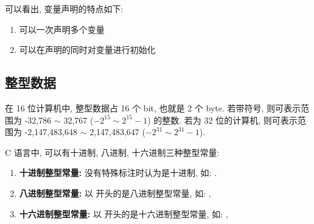        可以看出, 变量声明的特点如下:
            \begin{enumerate}
                \item 可以一次声明多个变量
                \item 可以在声明的同时对变量进行初始化
            \end{enumerate}


    \subsection{整型数据}
        \hspace*{2em} 在 16 位计算机中, 整型数据占 16 个 bit, 也就是 2 个 byte. 若带符号, 则可表示范围为 -32,786 $\sim$ 32,767 ($-2^{15} \sim 2^{15} - 1$) 的整数. 若为 32 位的计算机, 则可表示范围为 -2,147,483,648 $\sim$ 2,147,483,647 ($-2^{31} \sim 2^{31} - 1$).

        \hspace*{2em} C 语言中, 可以有十进制, 八进制, 十六进制三种整型常量:
            \begin{enumerate}
                \item \textbf{十进制整型常量:} 没有特殊标注时认为是十进制, 如: .
                \item \textbf{八进制整型常量:} 以  开头的是八进制整型常量, 如: , 
                \item \textbf{十六进制整型常量:} 以  开头的是十六进制整型常量, 如: , 
            \end{enumerate}

